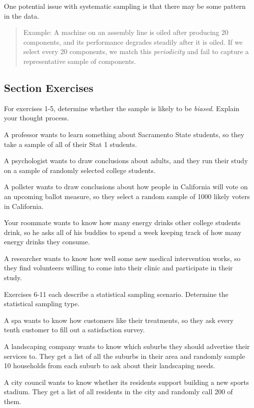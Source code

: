 \documentclass[
]{book}
\begin{document}
One potential issue with systematic sampling is that there may be some pattern in the data.

\begin{quote}
Example: A machine on an assembly line is oiled after producing 20 components, and its performance degrades steadily after it is oiled. If we select every 20 components, we match this \emph{periodicity} and fail to capture a representative sample of components.
\end{quote}

\subsection*{Section Exercises}\label{section-exercises-1}

For exercises 1-5, determine whether the sample is likely to be \emph{biased}. Explain your thought process.

A professor wants to learn something about Sacramento State students, so they take a sample of all of their Stat 1 students.

A psychologist wants to draw conclusions about adults, and they run their study on a sample of randomly selected college students.

A pollster wants to draw conclusions about how people in California will vote on an upcoming ballot measure, so they select a random sample of 1000 likely voters in California.

Your roommate wants to know how many energy drinks other college students drink, so he asks all of his buddies to spend a week keeping track of how many energy drinks they consume.

A researcher wants to know how well some new medical intervention works, so they find volunteers willing to come into their clinic and participate in their study.

Exercises 6-11 each describe a statistical sampling scenario. Determine the statistical sampling type.

A spa wants to know how customers like their treatments, so they ask every tenth customer to fill out a satisfaction survey.

A landscaping company wants to know which suburbs they should advertise their services to. They get a list of all the suburbs in their area and randomly sample 10 households from each suburb to ask about their landscaping needs.

A city council wants to know whether its residents support building a new sports stadium. They get a list of all residents in the city and randomly call 200 of them.
\end{document}
